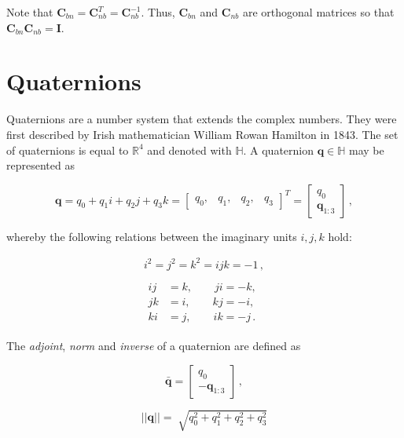 \noindent
Note that $\mathbf{C}_{bn} = \mathbf{C}^T_{nb} = \mathbf{C}^{-1}_{nb}$. Thus, $\mathbf{C}^{ }_{bn}$ and $\mathbf{C}_{nb}$ are orthogonal matrices so that $\mathbf{C}^{ }_{bn} \mathbf{C}_{nb} = \mathbf{I}$.  

\section{Quaternions}

Quaternions are a number system that extends the complex numbers. They were first described by Irish mathematician William Rowan Hamilton in 1843. The set of quaternions is equal to $\mathbb{R}^4$ and denoted with $\mathbb{H}$. A quaternion $\mathbf{q} \in \mathbb{H}$ may be represented as

\begin{equation}
  \mathbf{q} = q_0 + q_1 i + q_2 j + q_3 k = \begin{bmatrix}
  	q_0, & q_1, & q_2, & q_3
  \end{bmatrix}^T = \begin{bmatrix}
  	q_0 \\ \mathbf{q}_{1:3} 
  \end{bmatrix}\,,
\end{equation}
 
\noindent
whereby the following relations between the imaginary units $i, j, k$ hold:

\begin{equation}
  \begin{matrix}
i^2 =j^2=k^2=ijk =-1\,,\\ \\
  {\begin{split}
  ij & = k, \qquad ji = -k, \\
jk & = i, \qquad kj = -i, \\
ki & = j, \qquad ik = -j\,.
\end{split}}
\end{matrix}
\end{equation}

The \emph{adjoint}, \emph{norm} and \emph{inverse} of a quaternion are defined as

\begin{equation}
  \bar{\mathbf{q}} = \begin{bmatrix}
  	q_0 \\ -\mathbf{q}_{1:3} 
  \end{bmatrix}\,,
\end{equation}

\begin{equation}
  ||\mathbf{q}|| = \sqrt[]{q_0^2 + q_1^2 + q_2^2 + q_3^2}
\end{equation}

